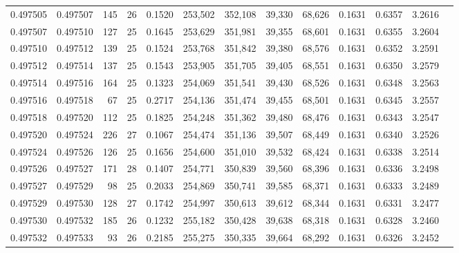 \begin{tabular}{rrrrrrrrrrrrr}
0.497505 & 0.497507 & 145 &  26 &                                     0.1520 & 253,502 & 352,108 &  39,330 &  68,626 & 0.1631 & 0.6357 & 3.2616 \\
0.497507 & 0.497510 & 127 &  25 &                                     0.1645 & 253,629 & 351,981 &  39,355 &  68,601 & 0.1631 & 0.6355 & 3.2604 \\
0.497510 & 0.497512 & 139 &  25 &                                     0.1524 & 253,768 & 351,842 &  39,380 &  68,576 & 0.1631 & 0.6352 & 3.2591 \\
0.497512 & 0.497514 & 137 &  25 &                                     0.1543 & 253,905 & 351,705 &  39,405 &  68,551 & 0.1631 & 0.6350 & 3.2579 \\
0.497514 & 0.497516 & 164 &  25 &                                     0.1323 & 254,069 & 351,541 &  39,430 &  68,526 & 0.1631 & 0.6348 & 3.2563 \\
0.497516 & 0.497518 &  67 &  25 &                                     0.2717 & 254,136 & 351,474 &  39,455 &  68,501 & 0.1631 & 0.6345 & 3.2557 \\
0.497518 & 0.497520 & 112 &  25 &                                     0.1825 & 254,248 & 351,362 &  39,480 &  68,476 & 0.1631 & 0.6343 & 3.2547 \\
0.497520 & 0.497524 & 226 &  27 &                                     0.1067 & 254,474 & 351,136 &  39,507 &  68,449 & 0.1631 & 0.6340 & 3.2526 \\
0.497524 & 0.497526 & 126 &  25 &                                     0.1656 & 254,600 & 351,010 &  39,532 &  68,424 & 0.1631 & 0.6338 & 3.2514 \\
0.497526 & 0.497527 & 171 &  28 &                                     0.1407 & 254,771 & 350,839 &  39,560 &  68,396 & 0.1631 & 0.6336 & 3.2498 \\
0.497527 & 0.497529 &  98 &  25 &                                     0.2033 & 254,869 & 350,741 &  39,585 &  68,371 & 0.1631 & 0.6333 & 3.2489 \\
0.497529 & 0.497530 & 128 &  27 &                                     0.1742 & 254,997 & 350,613 &  39,612 &  68,344 & 0.1631 & 0.6331 & 3.2477 \\
0.497530 & 0.497532 & 185 &  26 &                                     0.1232 & 255,182 & 350,428 &  39,638 &  68,318 & 0.1631 & 0.6328 & 3.2460 \\
0.497532 & 0.497533 &  93 &  26 &                                     0.2185 & 255,275 & 350,335 &  39,664 &  68,292 & 0.1631 & 0.6326 & 3.2452 \\

\end{tabular}
